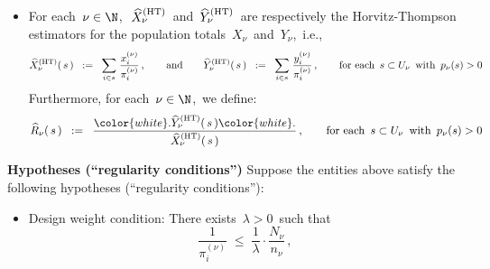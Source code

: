\begin{theorem}
\begin{itemize}
\begin{equation*}
    X_{\nu}
    \;\, := \,
        \underset{i \in U_{\nu}}{\sum}\,x^{(\nu)}_{i}\,,
    \quad\quad
    \textnormal{and}
    \quad\quad
    Y_{\nu}
    \;\, := \,
        \underset{i \in U_{\nu}}{\sum}\,y^{(\nu)}_{i}
    \end{equation*}
    Furthermore, for each \,$\nu \in \N$,\, we define:
    \begin{equation*}
    R_{\nu}
    \;\; := \;\;
        \dfrac{
            {\color{white}.}
            Y_{\nu}
            {\color{white}.}
            }{
            X_{\nu}
            }
    \end{equation*}
\item
    For each \,$\nu\in\N$,\,
    \,$\widehat{X}^{\textnormal{(HT)}}_{\nu}$\,
    and
    \,$\widehat{Y}^{\textnormal{(HT)}}_{\nu}$\,
    are respectively the Horvitz-Thompson estimators for the population totals
    \,$X_{\nu}$\, and \,$Y_{\nu}$,\, i.e.,
    \begin{equation*}
    \widehat{X}^{\textnormal{(HT)}}_{\nu}(\,s\,)
    \;\; := \;\;
        \underset{i \in s}{\sum}\;
        \dfrac{ x^{(\nu)}_{i} }{ \pi^{(\nu)}_{i} }\,,
    \quad\quad
    \textnormal{and}
    \quad\quad
    \widehat{Y}^{\textnormal{(HT)}}_{\nu}(\,s\,)
    \;\; := \;\;
        \underset{i \in s}{\sum}\;
        \dfrac{ y^{(\nu)}_{i} }{ \pi^{(\nu)}_{i} }\,,
    \quad\quad
    \textnormal{for each \,$s \subset U_{\nu}$\, with \,$p_{\nu}(s) > 0$}
    \end{equation*}
    Furthermore, for each \,$\nu \in \N$,\, we define:
    \begin{equation*}
    \widehat{R}_{\nu}(\,s\,)
    \;\; := \;\;
        \dfrac{
            {\color{white}.}
            \widehat{Y}^{\textnormal{(HT)}}_{\nu}(\,s\,)
            {\color{white}.}
            }{
            \widehat{X}^{\textnormal{(HT)}}_{\nu}(\,s\,)
            }\,,
    \quad\quad
    \textnormal{for each \,$s \subset U_{\nu}$\, with \,$p_{\nu}(s) > 0$}
    \end{equation*}
\end{itemize}
\vskip 0.2cm
\noindent
\textbf{Hypotheses (``regularity conditions'')}
\vskip 0.1cm
\noindent
Suppose the entities above satisfy the following hypotheses (``regularity conditions''):
\begin{itemize}
\item
    Design weight condition:
    There exists \,$\lambda > 0$\,
    such that
    \begin{equation*}
    \dfrac{1}{\pi^{(\nu)}_{i}}
    \;\leq\;
        \dfrac{1}{\lambda}
        \cdot
        \dfrac{N_{\nu}}{n_{\nu}}\,,

\end{equation*}
\end{itemize}
\end{theorem}
